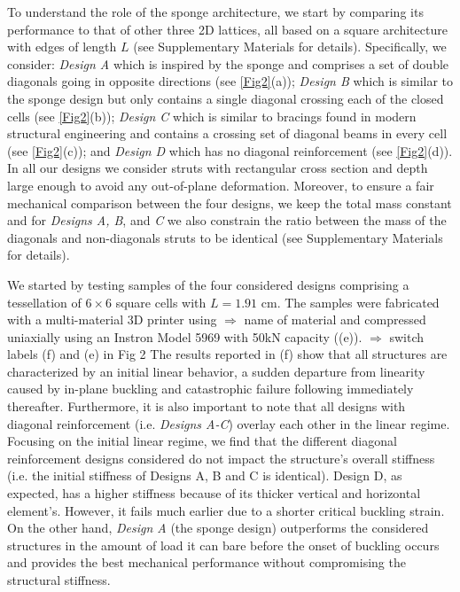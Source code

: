 \documentclass[9pt,twocolumn,twoside]{fernandes_paper}
\newcommand{\KB}[1]{\noindent\color{blue}$\Longrightarrow$ #1\normalcolor}
\newcommand{\mf}[1]{\noindent\color{orange}{$\Longrightarrow$#1}\normalcolor}
\begin{document}
To understand  the role of the sponge architecture, we start by comparing its performance to that of other three 2D lattices, all based on a   square architecture with edges of length $L$ (see Supplementary Materials for details). Specifically,  we  consider:
\emph{Design A}  which is inspired by the sponge and comprises a set of double diagonals going in opposite directions (see \cref{Fig2}(a)); \emph{Design B}  which is similar to the sponge design but only contains a single diagonal crossing each of the closed cells (see \cref{Fig2}(b));   \emph{Design C}  which is similar to bracings found in modern structural engineering and contains a crossing set of diagonal beams in every cell (see \cref{Fig2}(c)); and \emph{Design D}  which  has no diagonal reinforcement (see \cref{Fig2}(d)). In all our designs we consider struts with rectangular cross section and depth large enough to avoid any out-of-plane deformation. Moreover, to ensure a fair mechanical comparison between the four designs, we keep the total mass constant and
for \emph{Designs A, B}, and \emph{C} we also constrain the  ratio between the mass of the diagonals and non-diagonals struts to be identical (see Supplementary Materials for details).  %

We started by testing samples of the four considered designs comprising
a tessellation of $6\times6$ square cells with $L=1.91$ cm. The samples were fabricated with a multi-material 3D printer \mf{(add model @James)} using \KB{name of material} \mf{add info here @James} and compressed uniaxially  using  an Instron Model 5969 with 50kN capacity  ((e)). \KB{switch labels (f) and (e) in Fig 2} %
The results reported in (f)  show that all structures are characterized by an initial linear behavior, a sudden departure from linearity caused by in-plane buckling and catastrophic failure following immediately thereafter.   Furthermore, it is also important to note that all  designs with diagonal reinforcement (i.e. \emph{Designs A-C}) overlay each other in the linear regime. Focusing on the initial linear regime, we find that  the different diagonal reinforcement designs considered do not impact the structure's overall stiffness (i.e. the initial stiffness of Designs A, B and C is identical). Design D, as expected, has a higher stiffness because of its thicker vertical and horizontal element's. However, it fails much earlier due to a shorter critical buckling strain. On the other hand, \emph{Design A} (the sponge design) outperforms the  considered structures in the amount of load it can bare before the onset of buckling occurs and provides the best mechanical performance without compromising the structural stiffness.
\end{document}
